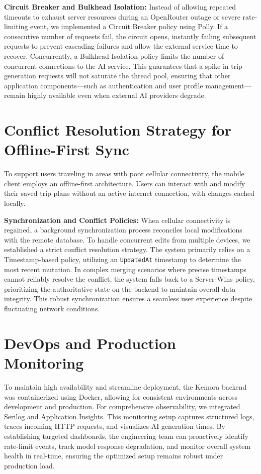 \textbf{Circuit Breaker and Bulkhead Isolation:}
Instead of allowing repeated timeouts to exhaust server resources during an OpenRouter outage or severe rate-limiting event, we implemented a Circuit Breaker policy using Polly. If a consecutive number of requests fail, the circuit opens, instantly failing subsequent requests to prevent cascading failures and allow the external service time to recover. Concurrently, a Bulkhead Isolation policy limits the number of concurrent connections to the AI service. This guarantees that a spike in trip generation requests will not saturate the thread pool, ensuring that other application components---such as authentication and user profile management---remain highly available even when external AI providers degrade.

\section{Conflict Resolution Strategy for Offline-First Sync}
To support users traveling in areas with poor cellular connectivity, the mobile client employs an offline-first architecture. Users can interact with and modify their saved trip plans without an active internet connection, with changes cached locally.

\textbf{Synchronization and Conflict Policies:}
When cellular connectivity is regained, a background synchronization process reconciles local modifications with the remote database. To handle concurrent edits from multiple devices, we established a strict conflict resolution strategy. The system primarily relies on a Timestamp-based policy, utilizing an \texttt{UpdatedAt} timestamp to determine the most recent mutation. In complex merging scenarios where precise timestamps cannot reliably resolve the conflict, the system falls back to a Server-Wins policy, prioritizing the authoritative state on the backend to maintain overall data integrity. This robust synchronization ensures a seamless user experience despite fluctuating network conditions.

\section{DevOps and Production Monitoring}
To maintain high availability and streamline deployment, the Kemora backend was containerized using Docker, allowing for consistent environments across development and production. For comprehensive observability, we integrated Serilog and Application Insights. This monitoring setup captures structured logs, traces incoming HTTP requests, and visualizes AI generation times. By establishing targeted dashboards, the engineering team can proactively identify rate-limit events, track model response degradation, and monitor overall system health in real-time, ensuring the optimized setup remains robust under production load.

